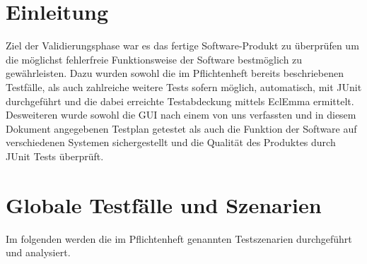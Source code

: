 \documentclass[12pt,a4paper,titlepage]{article}
\begin{document}
\section{Einleitung}

Ziel der Validierungsphase war es das fertige Software-Produkt zu überprüfen um die möglichst fehlerfreie Funktionsweise der Software bestmöglich zu gewährleisten. Dazu wurden sowohl die im Pflichtenheft bereits beschriebenen Testfälle, als auch zahlreiche weitere Tests sofern möglich, automatisch, mit JUnit durchgeführt und die dabei erreichte Testabdeckung mittels EclEmma ermittelt.
Desweiteren wurde sowohl die GUI nach einem von uns verfassten und in diesem Dokument angegebenen Testplan getestet als auch die Funktion der Software auf verschiedenen Systemen sichergestellt und die Qualität des Produktes durch JUnit Tests überprüft.

\section{Globale Testfälle und Szenarien}
Im folgenden werden die im Pflichtenheft genannten Testszenarien durchgeführt und analysiert.
\end{document}
